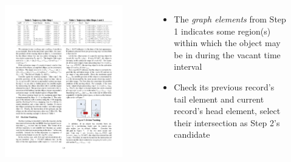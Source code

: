 \begin{frame}
\begin{columns}[c]
\begin{figure}[tb]
    \includegraphics[width=\columnwidth]{figures/2-1-11.pdf}
  \end{figure}


  \footnotesize{
    \begin{itemize}
      \item The \emph{graph elements} from Step 1 indicates some region(s) within which the object may be in during the vacant time interval
      \item Check its previous record's tail element and current record's head element, select their intersection as Step 2's candidate
    \end{itemize}
  }

\end{columns}

\end{frame}


